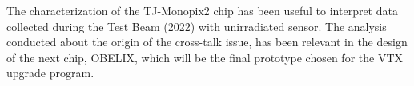The characterization of the TJ-Monopix2 chip has been useful to interpret data collected during the Test Beam (2022) with unirradiated sensor. The analysis conducted about the origin of the cross-talk issue, has been relevant in the design of the next chip, OBELIX, which will be the final prototype chosen for the VTX upgrade program.


